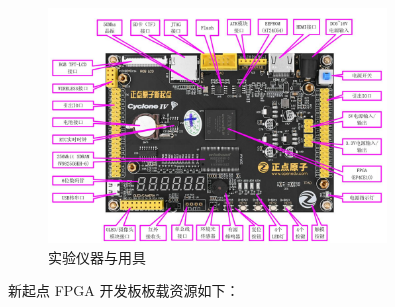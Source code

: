 \documentclass[UTF8]{article}
\theoremstyle{MyLineTheoremStyle} %
\theoremstyle{MyBlockTheoremStyle} %
\theoremstyle{MySubsubsectionStyle} %
\begin{document}
\begin{figure}[H]
    \centering
    \includegraphics[width=0.8\textwidth]{FPGA.png}
    \caption{实验仪器与用具}
    \label{fig:实验仪器与用具}
\end{figure}

新起点 FPGA 开发板板载资源如下：
\end{document}
